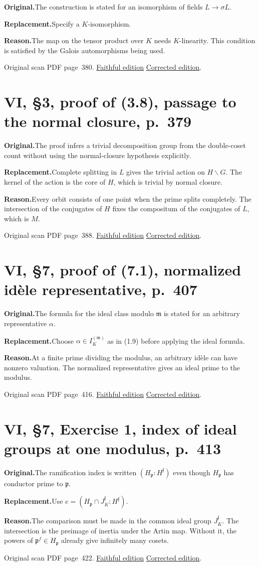 \documentclass[11pt,a4paper]{article}
\newcommand{\original}{\par\smallskip\noindent\textbf{Original.}\enspace}
\newcommand{\replacement}{\par\smallskip\noindent\textbf{Replacement.}\enspace}
\newcommand{\reason}{\par\smallskip\noindent\textbf{Reason.}\enspace}
\newcommand{\editionlink}[3]{\href{#1\#errata.#2}{#3}}
\newcommand{\location}[2]{%
  \par\smallskip\noindent Original scan PDF page~#2.\enspace
  \editionlink{Neukirch_Faithful.pdf}{#1}{Faithful edition}
  \quad\editionlink{Neukirch_Corrected.pdf}{#1}{Corrected edition}.}
\begin{document}
\original The construction is stated for an isomorphism of fields $L\to\sigma L$.
\replacement Specify a $K$-isomorphism.
\reason The map on the tensor product over $K$ needs $K$-linearity. This condition is satisfied by the Galois automorphisms being used.
\location{142}{380}

\setcounter{section}{142}
\section{VI, \S3, proof of (3.8), passage to the normal closure, p.~379}\label{errata:item:143}

\original The proof infers a trivial decomposition group from the double-coset count without using the normal-closure hypothesis explicitly.
\replacement Complete splitting in $L$ gives the trivial action on $H\backslash G$. The kernel of the action is the core of $H$, which is trivial by normal closure.
\reason Every orbit consists of one point when the prime splits completely. The intersection of the conjugates of $H$ fixes the compositum of the conjugates of $L$, which is $M$.
\location{143}{388}

\setcounter{section}{143}
\section{VI, \S7, proof of (7.1), normalized idèle representative, p.~407}\label{errata:item:144}

\original The formula for the ideal class modulo $\mathfrak m$ is stated for an arbitrary representative $\alpha$.
\replacement Choose $\alpha\in I_K^{(\mathfrak m)}$ as in (1.9) before applying the ideal formula.
\reason At a finite prime dividing the modulus, an arbitrary idèle can have nonzero valuation. The normalized representative gives an ideal prime to the modulus.
\location{144}{416}

\setcounter{section}{144}
\section{VI, \S7, Exercise 1, index of ideal groups at one modulus, p.~413}\label{errata:item:145}

\original The ramification index is written $(H_{\mathfrak p}:H^{\mathfrak f})$ even though $H_{\mathfrak p}$ has conductor prime to $\mathfrak p$.
\replacement Use $e=(H_{\mathfrak p}\cap J_K^{\mathfrak f}:H^{\mathfrak f})$.
\reason The comparison must be made in the common ideal group $J_K^{\mathfrak f}$. The intersection is the preimage of inertia under the Artin map. Without it, the powers of $\mathfrak p^f\in H_{\mathfrak p}$ already give infinitely many cosets.
\location{145}{422}
\end{document}
